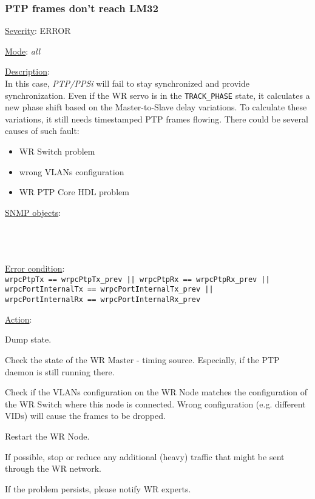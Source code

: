\subsubsection{\bf PTP frames don't reach LM32}
		\label{fail:timing:no_frames}
		\begin{pck_descr}
			\item [] \underline{Severity}: ERROR
			\item [] \underline{Mode}: \emph{all}
			\item [] \underline{Description}:\\
				In this case, \emph{PTP/PPSi} will fail to stay synchronized and provide
				synchronization. Even if the WR servo is in the \texttt{TRACK\_PHASE}
				state, it calculates a new phase shift based on the Master-to-Slave delay
				variations. To calculate these variations, it still needs timestamped
				PTP frames flowing. There could be several causes of such fault:
				\begin{itemize}
          \item WR Switch problem
					\item wrong VLANs configuration
					\item WR PTP Core HDL problem
				\end{itemize}
			\item [] \underline{SNMP objects}:\\
				{\footnotesize
				\\
				\\
				\\
				 }
			\item [] \underline{Error condition}:\\
				{\footnotesize
				\texttt{wrpcPtpTx == wrpcPtpTx\_prev || wrpcPtpRx == wrpcPtpRx\_prev ||}\\
				\texttt{wrpcPortInternalTx == wrpcPortInternalTx\_prev ||}\\
				\texttt{wrpcPortInternalRx == wrpcPortInternalRx\_prev} }
      \item [] \underline{Action}:
        \begin{pck_proc}
        \item Dump state.
        \item Check the state of the WR Master - timing source. Especially, if
          the PTP daemon is still running there.
        \item Check if the VLANs configuration on the WR Node matches the
          configuration of the WR Switch where this node is connected. Wrong
          configuration (e.g. different VIDs) will cause the frames to be
          dropped.
        \item Restart the WR Node.
        \item If possible, stop or reduce any additional (heavy) traffic that
          might be sent through the WR network.
        \item If the problem persists, please notify WR experts.
        \end{pck_proc}
		\end{pck_descr}

